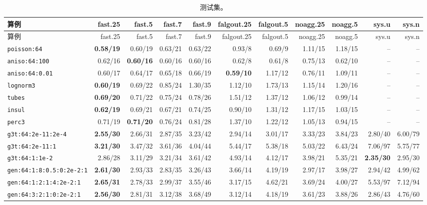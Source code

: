 {\tiny\setlength{\tabcolsep}{2.5pt}
\begin{longtable}{lrrrrrrrrrr}
\caption{测试集。}\\
\toprule
算例 & fast.25 & fast.5 & fast.7 & fast.9 & falgout.25 & falgout.5 & noagg.25 & noagg.5 & sys.u & sys.n \\
\midrule
\endfirsthead
\toprule
算例 & fast.25 & fast.5 & fast.7 & fast.9 & falgout.25 & falgout.5 & noagg.25 & noagg.5 & sys.u & sys.n \\
\midrule
\endhead
\bottomrule
\endlastfoot
\texttt{poisson:64} & \textbf{0.58/19} & 0.60/19 & 0.63/21 & 0.63/22 & 0.93/8 & 0.69/9 & 1.11/15 & 1.18/15 & -- & -- \\
\texttt{aniso:64:100} & 0.62/16 & \textbf{0.60/16} & 0.60/16 & 0.60/16 & 0.62/8 & 0.61/8 & 0.75/13 & 0.62/10 & -- & -- \\
\texttt{aniso:64:0.01} & 0.60/17 & 0.64/17 & 0.65/18 & 0.66/19 & \textbf{0.59/10} & 1.17/12 & 0.76/11 & 1.09/11 & -- & -- \\
\texttt{lognorm3} & \textbf{0.60/19} & 0.69/22 & 0.85/24 & 1.30/35 & 1.12/10 & 1.73/13 & 1.15/14 & 1.20/16 & -- & -- \\
\texttt{tubes} & \textbf{0.69/20} & 0.71/22 & 0.75/24 & 0.78/26 & 1.51/12 & 1.37/12 & 1.06/12 & 0.99/14 & -- & -- \\
\texttt{insul} & \textbf{0.62/19} & 0.69/21 & 0.67/21 & 0.74/25 & 0.90/10 & 1.31/12 & 1.17/15 & 1.03/15 & -- & -- \\
\texttt{perc3} & 0.71/19 & \textbf{0.71/20} & 0.76/24 & 0.81/28 & 1.37/10 & 1.22/12 & 1.05/13 & 0.94/15 & -- & -- \\
\texttt{g3t:64:2e-11:2e-4} & \textbf{2.55/30} & 2.66/31 & 2.87/35 & 3.23/42 & 2.94/14 & 3.01/17 & 3.33/23 & 3.84/23 & 2.80/40 & 6.00/79 \\
\texttt{g3t:64:2e-11:1} & \textbf{3.21/30} & 3.47/32 & 3.61/36 & 4.04/44 & 5.44/17 & 5.38/18 & 5.03/22 & 6.43/24 & 7.06/97 & 5.75/77 \\
\texttt{g3t:64:1:1e-2} & 2.86/28 & 3.11/29 & 3.21/34 & 3.61/42 & 4.93/14 & 4.12/17 & 3.98/21 & 5.35/21 & \textbf{2.35/30} & 2.95/30 \\
\texttt{gen:64:1:8:0.5:0:2e-2:1} & \textbf{2.61/30} & 2.93/33 & 2.83/35 & 3.26/43 & 3.66/14 & 4.19/19 & 2.97/17 & 3.98/27 & 2.94/42 & 4.99/62 \\
\texttt{gen:64:1:2:1:4:2e-2:1} & \textbf{2.65/31} & 2.78/33 & 2.99/37 & 3.55/46 & 3.17/15 & 4.62/21 & 3.69/24 & 4.00/27 & 5.53/97 & 7.12/94 \\
\texttt{gen:64:3:2:1:0:2e-2:1} & \textbf{2.56/30} & 2.81/31 & 3.12/38 & 3.68/49 & 3.12/14 & 4.18/19 & 3.61/23 & 3.88/26 & 2.86/43 & 4.76/60 \\

\end{longtable}}
